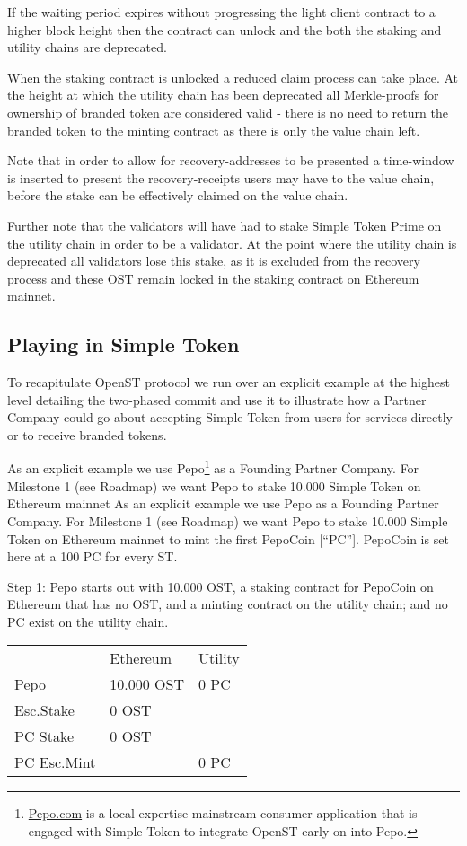 \documentclass[12pt,a4paper, twocolumn]{article}
\begin{document}
If the waiting period expires without progressing the light client contract to a higher block height then the contract can unlock and the both the staking and utility chains are deprecated.\par
When the staking contract is unlocked a reduced claim process can take place.  At the height at which the utility chain has been deprecated all Merkle-proofs for ownership of branded token are considered valid - there is no need to return the branded token to the minting contract as there is only the value chain left. \par
Note that in order to allow for recovery-addresses to be presented a time-window is inserted to present the recovery-receipts users may have to the value chain, before the stake can be effectively claimed on the value chain. \par
Further note that the validators will have had to stake Simple Token Prime on the utility chain in order to be a validator.  At the point where the utility chain is deprecated all validators lose this stake, as it is excluded from the recovery process and these OST remain locked in the staking contract on Ethereum mainnet. \par

\subsection{Playing in Simple Token}
To recapitulate OpenST protocol we run over an explicit example at the highest level detailing the two-phased commit and use it to illustrate how a Partner Company could go about accepting Simple Token from users for services directly or to receive branded tokens.\par
As an explicit example we use Pepo\footnote{ \href{https://pepo.com/}{Pepo.com} is a local expertise mainstream consumer application that is engaged with Simple Token to integrate OpenST early on into Pepo.} as a Founding Partner Company.  For Milestone 1 (see Roadmap) we want Pepo to stake 10.000 Simple Token on Ethereum mainnet As an explicit example we use Pepo as a Founding Partner Company.  For Milestone 1 (see Roadmap) we want Pepo to stake 10.000 Simple Token on Ethereum mainnet to mint the first PepoCoin [“PC”].  PepoCoin is set here at a 100 PC for every ST.\par
Step 1: Pepo starts out with 10.000 OST, a staking contract for PepoCoin on Ethereum that has no OST, and a minting contract on the utility chain; and no PC exist on the utility chain.
\begin{table}[H]
\centering
\label{Step-1}
\begin{tabular}{lll}
    & Ethereum    &   Utility   \\
Pepo        & 10.000 OST & 0 PC \\
Esc.Stake   & 0 OST      &      \\
PC Stake    & 0 OST      &      \\
PC Esc.Mint &            & 0 PC
\end{tabular}
\end{table}
\end{document}

